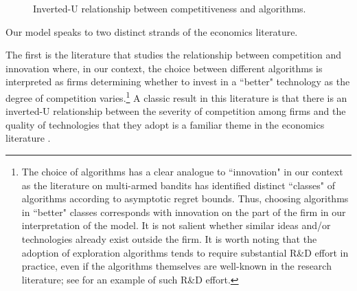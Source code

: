 \begin{figure}
\begin{center}

\caption{Inverted-U relationship between competitiveness and algorithms.}
\label{fig:inverted-U}
\end{center}
\end{figure}
 Our model speaks to two distinct strands of the economics literature.

The first is the literature that studies the relationship between competition and innovation where, in our context,  the choice between different algorithms is interpreted as firms determining whether to invest in a ``better" technology as the degree of competition varies.\footnote{The choice of algorithms has a clear analogue to ``innovation" in our context as the literature on multi-armed bandits has identified distinct ``classes" of algorithms according to asymptotic regret bounds. Thus, choosing algorithms in ``better" classes corresponds with innovation on the part of the firm in our interpretation of the model. It is not salient whether similar ideas and/or technologies already exist outside the firm. It is worth noting that the adoption of exploration algorithms tends to require substantial R\&D effort in practice, even if the algorithms themselves are well-known in the research literature; see \citet{MWT-WhitePaper-2016} for an example of such R\&D effort.} A classic result in this literature is that there is an inverted-U relationship between the severity of competition among firms and the quality of technologies that they adopt is a familiar theme in the economics literature \citep[\eg][]{Aghion-QJE05,Vives-08}.

